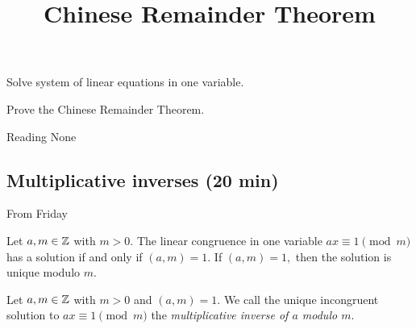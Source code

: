 \documentclass{../ximera}
\title{Chinese Remainder Theorem}
\begin{document}
\begin{abstract}
\end{abstract}
\maketitle


\begin{obj}
\item Solve system of linear equations in one variable.
 \item Prove the Chinese Remainder Theorem.
\end{obj}


\begin{pre}
    \item[Reading] None
\end{pre}

\subsection{Multiplicative inverses (20 min)}
From Friday

\begin{cor*}[Corollary 2.8]\label{cor:condition-invertible}
    Let $a,m\in\mathbb Z$ with $m>0.$ The linear congruence in one variable $ax\equiv 1\pmod{m}$ has a solution if and only if $(a,m)=1$. If $(a,m)=1,$ then the solution is unique modulo $m$. 
\end{cor*}

\begin{defn}\label{defn:mult-inv} Let $a,m\in\mathbb Z$ with $m>0$ and $(a,m)=1.$
    We call the unique incongruent solution to $ax\equiv 1\pmod m$ the \emph{multiplicative inverse of $a$ modulo $m$}.
\end{defn}
\end{document}
